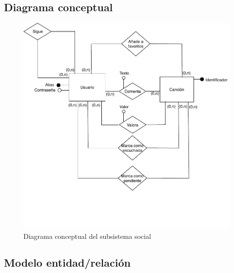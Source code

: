\subsection{Diagrama conceptual}

\begin{figure}[H]
  \caption{Diagrama conceptual del subsistema social}
  \centering
  \includegraphics{diagramas/conceptual-social.pdf}
\end{figure}

\subsection{Modelo entidad/relación}
